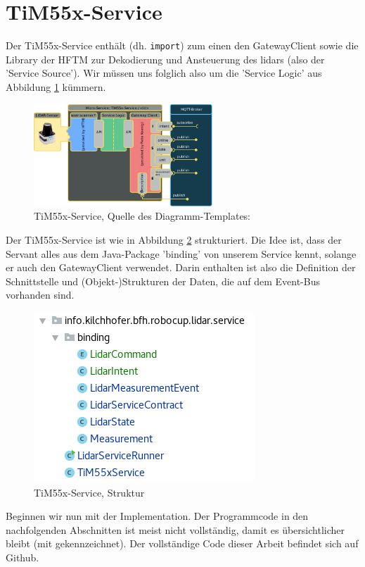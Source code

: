 \section{TiM55x-Service}
Der TiM55x-Service enthält (dh. \verb|import|) zum einen den GatewayClient sowie die Library der HFTM zur Dekodierung und Ansteuerung des \acrshort{lidar}s (also der 'Service Source'). Wir müssen uns folglich also um die 'Service Logic' aus Abbildung \ref{fig:lidarservice} kümmern.
\begin{figure}[H]
	\centering
	\includegraphics[width=0.6\textwidth]{img/tim55xservice.pdf}
	\caption{TiM55x-Service, Quelle des Diagramm-Templates: \cite{ch.quantasy.mqtt.gateway}}
	\label{fig:lidarservice}
\end{figure}

Der TiM55x-Service ist wie in Abbildung \ref{fig:structure_lidarservice} strukturiert. Die Idee ist, dass der Servant alles aus dem Java-Package 'binding' von unserem Service kennt, solange er auch den GatewayClient verwendet. Darin enthalten ist also die Definition der Schnittstelle und (Objekt-)Strukturen der Daten, die auf dem Event-Bus vorhanden sind.
\begin{figure}[H]
	\centering
	\includegraphics[scale=0.5]{img/tim55x-java-packagestructure.png}
	\caption{TiM55x-Service, Struktur}
	\label{fig:structure_lidarservice}
\end{figure}

Beginnen wir nun mit der Implementation. Der Programmcode in den nachfolgenden Abschnitten ist meist nicht vollständig, damit es übersichtlicher bleibt (mit  gekennzeichnet). Der vollständige Code dieser Arbeit befindet sich auf Github\cite{github-thesis}. \\
